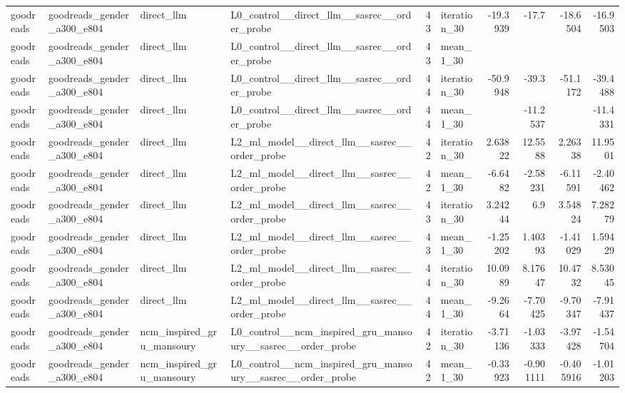 \begin{table}[htbp!]
\begin{tabular}{llllrlrrrr}
goodreads & goodreads\_gender\_a300\_e804 & direct\_llm & L0\_control\_\_direct\_llm\_\_sasrec\_\_order\_probe & 43 & iteration\_30 & -19.3939 & -17.7 & -18.6504 & -16.9503 \\
goodreads & goodreads\_gender\_a300\_e804 & direct\_llm & L0\_control\_\_direct\_llm\_\_sasrec\_\_order\_probe & 43 & mean\_1\_30 & \textemdash{} & \textemdash{} & \textemdash{} & \textemdash{} \\
goodreads & goodreads\_gender\_a300\_e804 & direct\_llm & L0\_control\_\_direct\_llm\_\_sasrec\_\_order\_probe & 44 & iteration\_30 & -50.9948 & -39.3 & -51.1172 & -39.4488 \\
goodreads & goodreads\_gender\_a300\_e804 & direct\_llm & L0\_control\_\_direct\_llm\_\_sasrec\_\_order\_probe & 44 & mean\_1\_30 & \textemdash{} & -11.2537 & \textemdash{} & -11.4331 \\
goodreads & goodreads\_gender\_a300\_e804 & direct\_llm & L2\_ml\_model\_\_direct\_llm\_\_sasrec\_\_order\_probe & 42 & iteration\_30 & 2.63822 & 12.5588 & 2.26338 & 11.9501 \\
goodreads & goodreads\_gender\_a300\_e804 & direct\_llm & L2\_ml\_model\_\_direct\_llm\_\_sasrec\_\_order\_probe & 42 & mean\_1\_30 & -6.6482 & -2.58231 & -6.11591 & -2.40462 \\
goodreads & goodreads\_gender\_a300\_e804 & direct\_llm & L2\_ml\_model\_\_direct\_llm\_\_sasrec\_\_order\_probe & 43 & iteration\_30 & 3.24244 & 6.9 & 3.54824 & 7.28279 \\
goodreads & goodreads\_gender\_a300\_e804 & direct\_llm & L2\_ml\_model\_\_direct\_llm\_\_sasrec\_\_order\_probe & 43 & mean\_1\_30 & -1.25202 & 1.40393 & -1.41029 & 1.59429 \\
goodreads & goodreads\_gender\_a300\_e804 & direct\_llm & L2\_ml\_model\_\_direct\_llm\_\_sasrec\_\_order\_probe & 44 & iteration\_30 & 10.0989 & 8.17647 & 10.4732 & 8.53045 \\
goodreads & goodreads\_gender\_a300\_e804 & direct\_llm & L2\_ml\_model\_\_direct\_llm\_\_sasrec\_\_order\_probe & 44 & mean\_1\_30 & -9.2664 & -7.70425 & -9.70347 & -7.91437 \\
goodreads & goodreads\_gender\_a300\_e804 & ncm\_inspired\_gru\_mansoury & L0\_control\_\_ncm\_inspired\_gru\_mansoury\_\_sasrec\_\_order\_probe & 42 & iteration\_30 & -3.71136 & -1.03333 & -3.97428 & -1.54704 \\
goodreads & goodreads\_gender\_a300\_e804 & ncm\_inspired\_gru\_mansoury & L0\_control\_\_ncm\_inspired\_gru\_mansoury\_\_sasrec\_\_order\_probe & 42 & mean\_1\_30 & -0.33923 & -0.901111 & -0.405916 & -1.01203 \\

\end{tabular}
\end{table}
